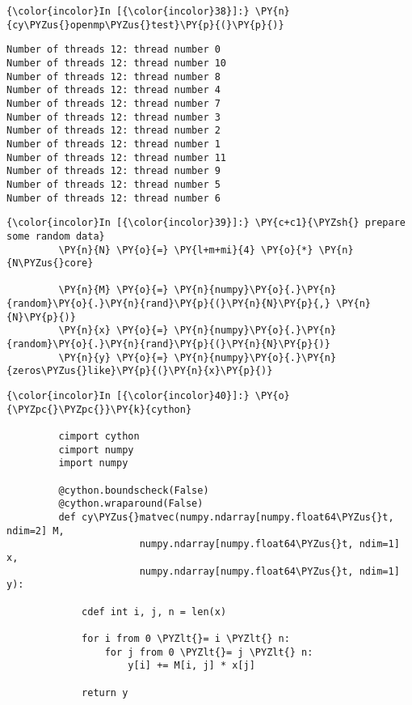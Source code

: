     \begin{Verbatim}[commandchars=\\\{\}]
{\color{incolor}In [{\color{incolor}38}]:} \PY{n}{cy\PYZus{}openmp\PYZus{}test}\PY{p}{(}\PY{p}{)}
\end{Verbatim}

    \begin{Verbatim}[commandchars=\\\{\}]
Number of threads 12: thread number 0
Number of threads 12: thread number 10
Number of threads 12: thread number 8
Number of threads 12: thread number 4
Number of threads 12: thread number 7
Number of threads 12: thread number 3
Number of threads 12: thread number 2
Number of threads 12: thread number 1
Number of threads 12: thread number 11
Number of threads 12: thread number 9
Number of threads 12: thread number 5
Number of threads 12: thread number 6

    \end{Verbatim}



    \begin{Verbatim}[commandchars=\\\{\}]
{\color{incolor}In [{\color{incolor}39}]:} \PY{c+c1}{\PYZsh{} prepare some random data}
         \PY{n}{N} \PY{o}{=} \PY{l+m+mi}{4} \PY{o}{*} \PY{n}{N\PYZus{}core}
         
         \PY{n}{M} \PY{o}{=} \PY{n}{numpy}\PY{o}{.}\PY{n}{random}\PY{o}{.}\PY{n}{rand}\PY{p}{(}\PY{n}{N}\PY{p}{,} \PY{n}{N}\PY{p}{)}
         \PY{n}{x} \PY{o}{=} \PY{n}{numpy}\PY{o}{.}\PY{n}{random}\PY{o}{.}\PY{n}{rand}\PY{p}{(}\PY{n}{N}\PY{p}{)}
         \PY{n}{y} \PY{o}{=} \PY{n}{numpy}\PY{o}{.}\PY{n}{zeros\PYZus{}like}\PY{p}{(}\PY{n}{x}\PY{p}{)}
\end{Verbatim}



    \begin{Verbatim}[commandchars=\\\{\}]
{\color{incolor}In [{\color{incolor}40}]:} \PY{o}{\PYZpc{}\PYZpc{}}\PY{k}{cython}
         
         cimport cython
         cimport numpy
         import numpy
         
         @cython.boundscheck(False)
         @cython.wraparound(False)
         def cy\PYZus{}matvec(numpy.ndarray[numpy.float64\PYZus{}t, ndim=2] M, 
                       numpy.ndarray[numpy.float64\PYZus{}t, ndim=1] x, 
                       numpy.ndarray[numpy.float64\PYZus{}t, ndim=1] y):
         
             cdef int i, j, n = len(x)
         
             for i from 0 \PYZlt{}= i \PYZlt{} n:
                 for j from 0 \PYZlt{}= j \PYZlt{} n:
                     y[i] += M[i, j] * x[j]
                     
             return y
\end{Verbatim}

